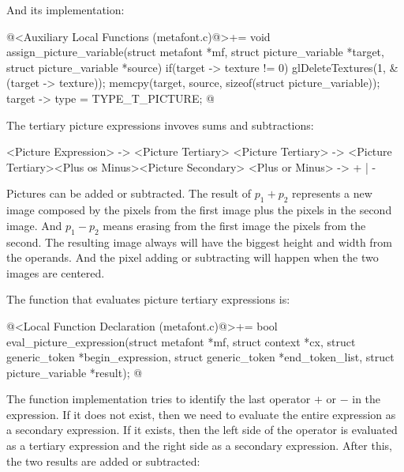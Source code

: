 And its implementation:

\iniciocodigo
@<Auxiliary Local Functions (metafont.c)@>+=
void assign_picture_variable(struct metafont *mf,
                             struct picture_variable *target,
                             struct picture_variable *source){
  if(target -> texture != 0)
    glDeleteTextures(1, &(target -> texture));
  memcpy(target, source, sizeof(struct picture_variable));
  target -> type = TYPE_T_PICTURE;
}
@
\fimcodigo


The tertiary picture expressions invoves sums and subtractions:

\alinhaverbatim
<Picture Expression> -> <Picture Tertiary>
<Picture Tertiary> -> <Picture Tertiary><Plus os Minus><Picture Secondary>
<Plus or Minus> -> + | -
\alinhanormal

Pictures can be added or subtracted. The result of $p_1+p_2$
represents a new image composed by the pixels from the first image
plus the pixels in the second image. And $p_1-p_2$ means erasing from
the first image the pixels from the second.  The resulting image always
will have the biggest height and width from the operands. And the
pixel adding or subtracting will happen when the two images are
centered.

The function that evaluates picture tertiary expressions is:

\iniciocodigo
@<Local Function Declaration (metafont.c)@>+=
bool eval_picture_expression(struct metafont *mf, struct context *cx,
                             struct generic_token *begin_expression,
                             struct generic_token *end_token_list,
                             struct picture_variable *result);
@
\fimcodigo

The function implementation tries to identify the last operator $+$ or
$-$ in the expression. If it does not exist, then we need to evaluate
the entire expression as a secondary expression. If it exists, then
the left side of the operator is evaluated as a tertiary expression
and the right side as a secondary expression. After this, the two
results are added or subtracted:

